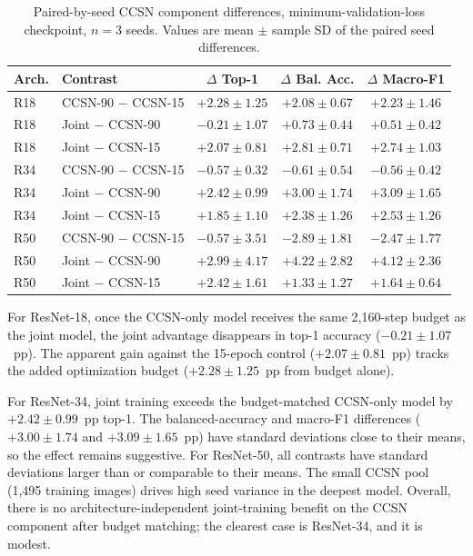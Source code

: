 \documentclass[11pt,a4paper]{article}
\begin{document}
\begin{table}[!htbp]
\centering
\small
\setlength{\tabcolsep}{5pt}
\begin{tabular}{llccc}
\toprule
\textbf{Arch.} & \textbf{Contrast} & \textbf{$\Delta$ Top-1} & \textbf{$\Delta$ Bal. Acc.} & \textbf{$\Delta$ Macro-F1} \\
\midrule
R18 & CCSN-90 $-$ CCSN-15 & $+2.28 \pm 1.25$ & $+2.08 \pm 0.67$ & $+2.23 \pm 1.46$ \\
R18 & Joint $-$ CCSN-90 & $-0.21 \pm 1.07$ & $+0.73 \pm 0.44$ & $+0.51 \pm 0.42$ \\
R18 & Joint $-$ CCSN-15 & $+2.07 \pm 0.81$ & $+2.81 \pm 0.71$ & $+2.74 \pm 1.03$ \\
R34 & CCSN-90 $-$ CCSN-15 & $-0.57 \pm 0.32$ & $-0.61 \pm 0.54$ & $-0.56 \pm 0.42$ \\
R34 & Joint $-$ CCSN-90 & $+2.42 \pm 0.99$ & $+3.00 \pm 1.74$ & $+3.09 \pm 1.65$ \\
R34 & Joint $-$ CCSN-15 & $+1.85 \pm 1.10$ & $+2.38 \pm 1.26$ & $+2.53 \pm 1.26$ \\
R50 & CCSN-90 $-$ CCSN-15 & $-0.57 \pm 3.51$ & $-2.89 \pm 1.81$ & $-2.47 \pm 1.77$ \\
R50 & Joint $-$ CCSN-90 & $+2.99 \pm 4.17$ & $+4.22 \pm 2.82$ & $+4.12 \pm 2.36$ \\
R50 & Joint $-$ CCSN-15 & $+2.42 \pm 1.61$ & $+1.33 \pm 1.27$ & $+1.64 \pm 0.64$ \\
\bottomrule
\end{tabular}
\caption{Paired-by-seed CCSN component differences, minimum-validation-loss checkpoint, $n=3$ seeds. Values are mean $\pm$ sample SD of the paired seed differences.}
\label{tab:budget_contrasts}
\end{table}

For ResNet-18, once the CCSN-only model receives the same 2,160-step budget as the joint model, the joint advantage disappears in top-1 accuracy ($-0.21 \pm 1.07$~pp). The apparent gain against the 15-epoch control ($+2.07 \pm 0.81$~pp) tracks the added optimization budget ($+2.28 \pm 1.25$~pp from budget alone).

For ResNet-34, joint training exceeds the budget-matched CCSN-only model by $+2.42 \pm 0.99$~pp top-1. The balanced-accuracy and macro-F1 differences ($+3.00 \pm 1.74$ and $+3.09 \pm 1.65$~pp) have standard deviations close to their means, so the effect remains suggestive. For ResNet-50, all contrasts have standard deviations larger than or comparable to their means. The small CCSN pool (1,495 training images) drives high seed variance in the deepest model. Overall, there is no architecture-independent joint-training benefit on the CCSN component after budget matching; the clearest case is ResNet-34, and it is modest.
\end{document}
